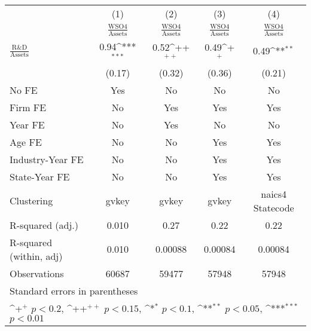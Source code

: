 {
\def\sym#1{\ifmmode^{#1}\else\(^{#1}\)\fi}
\begin{tabular}{l*{4}{c}}
\toprule
                    &\multicolumn{1}{c}{(1)}&\multicolumn{1}{c}{(2)}&\multicolumn{1}{c}{(3)}&\multicolumn{1}{c}{(4)}\\
                    &\multicolumn{1}{c}{$\frac{\textrm{WSO4}}{\textrm{Assets}}$}&\multicolumn{1}{c}{$\frac{\textrm{WSO4}}{\textrm{Assets}}$}&\multicolumn{1}{c}{$\frac{\textrm{WSO4}}{\textrm{Assets}}$}&\multicolumn{1}{c}{$\frac{\textrm{WSO4}}{\textrm{Assets}}$}\\
\midrule
$\frac{\textrm{R\&D}}{\textrm{Assets}}$&        0.94\sym{***}&        0.52\sym{++} &        0.49\sym{+}  &        0.49\sym{**} \\
                    &      (0.17)         &      (0.32)         &      (0.36)         &      (0.21)         \\
\addlinespace
No FE               &         Yes         &          No         &          No         &          No         \\
\addlinespace
Firm FE             &          No         &         Yes         &         Yes         &         Yes         \\
\addlinespace
Year FE             &          No         &         Yes         &          No         &          No         \\
\addlinespace
Age FE              &          No         &          No         &         Yes         &         Yes         \\
\addlinespace
Industry-Year FE    &          No         &          No         &         Yes         &         Yes         \\
\addlinespace
State-Year FE       &          No         &          No         &         Yes         &         Yes         \\
\midrule
Clustering          &       gvkey         &       gvkey         &       gvkey         &naics4 Statecode         \\
R-squared (adj.)    &       0.010         &        0.27         &        0.22         &        0.22         \\
R-squared (within, adj)&       0.010         &     0.00088         &     0.00084         &     0.00084         \\
Observations        &       60687         &       59477         &       57948         &       57948         \\
\bottomrule
\multicolumn{5}{l}{\footnotesize Standard errors in parentheses}\\
\multicolumn{5}{l}{\footnotesize \sym{+} \(p<0.2\), \sym{++} \(p<0.15\), \sym{*} \(p<0.1\), \sym{**} \(p<0.05\), \sym{***} \(p<0.01\)}\\
\end{tabular}
}

